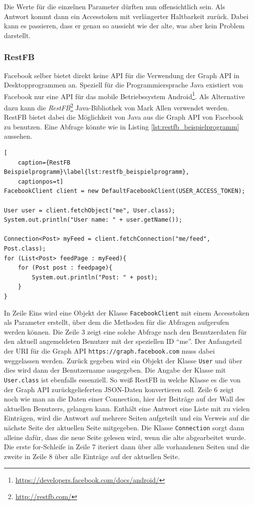 Die Werte für die einzelnen Parameter dürften nun offensichtlich sein. Als Antwort kommt dann ein Accesstoken mit verlängerter Haltbarkeit zurück. Dabei kann es passieren, dass er genau so aussieht wie der alte, was aber kein Problem darstellt.



\subsubsection{RestFB} %
\label{ssub:restfb}

Facebook selber bietet direkt keine API für die Verwendung der Graph API in Desktopprogrammen an. Speziell für die Programmiersprache Java existiert von Facebook nur eine API für das mobile Betriebssystem Android\footnote{\url{https://developers.facebook.com/docs/android/}}. Als Alternative dazu kann die \emph{RestFB}\footnote{\url{ http://restfb.com/}} Java-Bibliothek von Mark Allen verwendet werden. RestFB bietet dabei die Möglichkeit von Java aus die Graph API von Facebook zu benutzen. Eine Abfrage könnte wie in Listing \ref{lst:restfb_beispielprogramm} aussehen.

\begin{lstlisting}[
    caption={RestFB Beispielprogramm}\label{lst:restfb_beispielprogramm},
    captionpos=t]
FacebookClient client = new DefaultFacebookClient(USER_ACCESS_TOKEN);

User user = client.fetchObject("me", User.class);
System.out.println("User name: " + user.getName());

Connection<Post> myFeed = client.fetchConnection("me/feed", Post.class);
for (List<Post> feedPage : myFeed){
    for (Post post : feedpage){
        System.out.println("Post: " + post);
    }
}
\end{lstlisting} 

In Zeile Eins wird eine Objekt der Klasse \texttt{FacebookClient} mit einem Accesstoken als Parameter erstellt, über dem die Methoden für die Abfragen aufgerufen werden können. Die Zeile 3 zeigt eine solche Abfrage nach den Benutzerdaten für den aktuell angemeldeten Benutzer mit der speziellen ID \enquote{me}. Der Anfangsteil der URI für die Graph API \texttt{https://graph.facebook.com} muss dabei weggelassen werden. Zurück gegeben wird ein Objekt der Klasse \texttt{User} und über dies wird dann der Benutzername ausgegeben. Die Angabe der Klasse mit \texttt{User.class} ist ebenfalls essenziell. So weiß RestFB in welche Klasse es die von der Graph API zurückgelieferten JSON-Daten konvertieren soll. Zeile 6 zeigt noch wie man an die Daten einer Connection, hier der Beiträge auf der Wall des aktuellen Benutzers, gelangen kann. Enthält eine Antwort eine Liste mit zu vielen Einträgen, wird die Antwort auf mehrere Seiten aufgeteilt und ein Verweis auf die nächste Seite der aktuellen Seite mitgegeben. Die Klasse \texttt{Connection} sorgt dann alleine dafür, dass die neue Seite gelesen wird, wenn die alte abgearbeitet wurde. Die erste for-Schleife in Zeile 7 iteriert dann über alle vorhandenen Seiten und die zweite in Zeile 8 über alle Einträge auf der aktuellen Seite.

